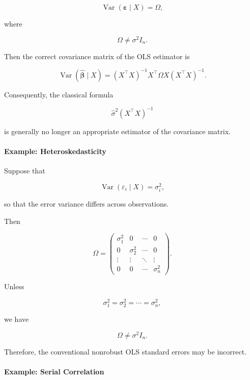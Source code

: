 \[
\boxed{
\operatorname{Var}
(\boldsymbol{\varepsilon}\mid X)
=
\Omega,
}
\]

where

\[
\Omega
\neq
\sigma^2I_n.
\]

Then the correct covariance matrix of the OLS estimator is

\[
\boxed{
\operatorname{Var}
\left(
\widehat{\boldsymbol{\beta}}\mid X
\right)
=
(X^\top X)^{-1}
X^\top
\Omega
X
(X^\top X)^{-1}.
}
\]

Consequently, the classical formula

\[
\widehat{\sigma}^2(X^\top X)^{-1}
\]

is generally no longer an appropriate estimator of the covariance matrix.



\paragraph{Example: Heteroskedasticity}

Suppose that

\[
\operatorname{Var}
(\varepsilon_i\mid X)
=
\sigma_i^2,
\]

so that the error variance differs across observations.

Then

\[
\Omega
=
\begin{pmatrix}
\sigma_1^2 & 0 & \cdots & 0\\
0 & \sigma_2^2 & \cdots & 0\\
\vdots & \vdots & \ddots & \vdots\\
0 & 0 & \cdots & \sigma_n^2
\end{pmatrix}.
\]

Unless

\[
\sigma_1^2
=
\sigma_2^2
=
\cdots
=
\sigma_n^2,
\]

we have

\[
\Omega
\neq
\sigma^2I_n.
\]

Therefore, the conventional nonrobust OLS standard errors may be incorrect.



\paragraph{Example: Serial Correlation}

